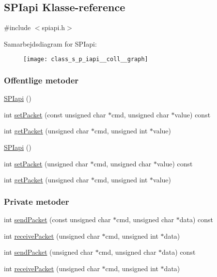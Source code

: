 \hypertarget{class_s_p_iapi}{}\subsection{S\+P\+Iapi Klasse-\/reference}
\label{class_s_p_iapi}


{\ttfamily \#include $<$spiapi.\+h$>$}



Samarbejdsdiagram for S\+P\+Iapi\+:
\nopagebreak
\begin{figure}[H]
\begin{center}
\leavevmode
\texttt{[image: class\_s\_p\_iapi\_\_coll\_\_graph]}
\end{center}
\end{figure}
\subsubsection*{Offentlige metoder}
\begin{DoxyCompactItemize}
\item 
\hyperlink{class_s_p_iapi_ae0ce1f581babcf0dab1d0559a352d514}{S\+P\+Iapi} ()
\item 
int \hyperlink{class_s_p_iapi_a197b3f71fa8f68516260bcb3b6985c6b}{set\+Packet} (const unsigned char $\ast$cmd, unsigned char $\ast$value) const 
\item 
int \hyperlink{class_s_p_iapi_afce62b978fa58c0ccefe336835cda0bb}{get\+Packet} (unsigned char $\ast$cmd, unsigned int $\ast$value)
\item 
\hyperlink{class_s_p_iapi_ae0ce1f581babcf0dab1d0559a352d514}{S\+P\+Iapi} ()
\item 
int \hyperlink{class_s_p_iapi_ad5902c2fbc9a0b0a4c807b9da5197fcf}{set\+Packet} (unsigned char $\ast$cmd, unsigned char $\ast$value) const 
\item 
int \hyperlink{class_s_p_iapi_afce62b978fa58c0ccefe336835cda0bb}{get\+Packet} (unsigned char $\ast$cmd, unsigned int $\ast$value)
\end{DoxyCompactItemize}
\subsubsection*{Private metoder}
\begin{DoxyCompactItemize}
\item 
int \hyperlink{class_s_p_iapi_aeeb857d3584d80daa2588a4d971b248e}{send\+Packet} (const unsigned char $\ast$cmd, unsigned char $\ast$data) const 
\item 
int \hyperlink{class_s_p_iapi_a65cbe59b0788556afcfdcac59de1752a}{receive\+Packet} (unsigned char $\ast$cmd, unsigned int $\ast$data)
\item 
int \hyperlink{class_s_p_iapi_a8159ee4c56139354ea1302bb64b99a2d}{send\+Packet} (unsigned char $\ast$cmd, unsigned char $\ast$data) const 
\item 
int \hyperlink{class_s_p_iapi_a65cbe59b0788556afcfdcac59de1752a}{receive\+Packet} (unsigned char $\ast$cmd, unsigned int $\ast$data)
\end{DoxyCompactItemize}


